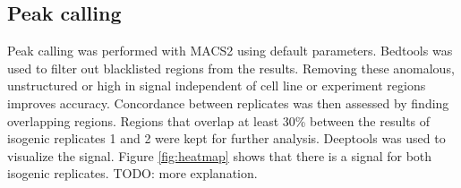 \documentclass{article}
\begin{document}



\subsection{Peak calling}



Peak calling was performed with MACS2\cite{gaspar2018improved} using default parameters. Bedtools\cite{quinlan2010bedtools} was used to filter out blacklisted regions from the results. Removing these anomalous, unstructured or high in signal independent of cell line or experiment regions improves accuracy\cite{amemiya2019encode}. Concordance between replicates was then assessed by finding overlapping regions. Regions that overlap at least 30\% between the results of isogenic replicates 1 and 2 were kept for further analysis. Deeptools\cite{ramirez2014deeptools} was used to visualize the signal. Figure \ref{fig:heatmap} shows that there is a signal for both isogenic replicates. TODO: more explanation.
\end{document}
